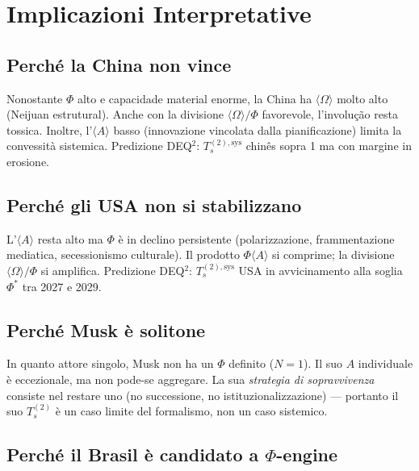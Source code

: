 \section{Implicazioni Interpretative}\label{implicazioni-interpretative}

\subsection{Perché la China non vince}\label{perchuxe9-la-cina-non-vince}

Nonostante \(\Phi\) alto e capacidade material enorme, la China ha
\(\langle\Omega\rangle\) molto alto (Neijuan estrutural). Anche con la
divisione \(\langle\Omega\rangle/\Phi\) favorevole, l'involução resta
tossica. Inoltre, l'\(\langle A\rangle\) basso (innovazione vincolata
dalla pianificazione) limita la convessità sistemica. Predizione DEQ$^2$:
\(T_s^{(2),\text{sys}}\) chinês sopra 1 ma con margine in erosione.

\subsection{Perché gli USA non si
stabilizzano}\label{perchuxe9-gli-usa-non-si-stabilizzano}

L'\(\langle A\rangle\) resta alto ma \(\Phi\) è in declino persistente
(polarizzazione, frammentazione mediatica, secessionismo culturale). Il
prodotto \(\Phi\langle A\rangle\) si comprime; la divisione
\(\langle\Omega\rangle/\Phi\) si amplifica. Predizione DEQ$^2$:
\(T_s^{(2),\text{sys}}\) USA in avvicinamento alla soglia \(\Phi^*\) tra
2027 e 2029.

\subsection{Perché Musk è solitone}\label{perchuxe9-musk-uxe8-solitone}

In quanto attore singolo, Musk non ha un \(\Phi\) definito (\(N=1\)). Il
suo \(A\) individuale è eccezionale, ma non pode-se aggregare. La sua
\emph{strategia di sopravvivenza} consiste nel restare uno (no
successione, no istituzionalizzazione) --- portanto il suo \(T_s^{(2)}\) è
un caso limite del formalismo, non un caso sistemico.

\subsection{Perché il Brasil è candidato a
$\Phi$-engine}\label{perchuxe9-il-brasile-uxe8-candidato-a-ux3c6-engine}

